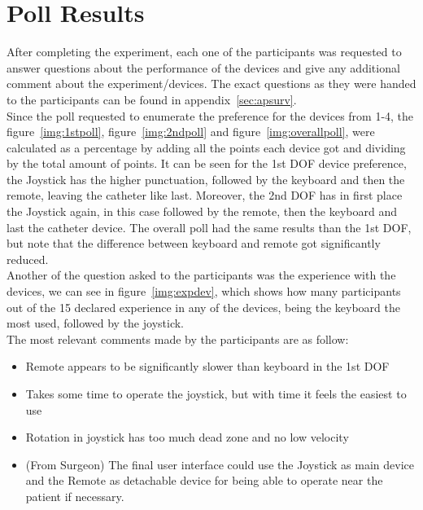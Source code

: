 \section{Poll Results}\label{sec:pollres}
After completing the experiment, each one of the participants was requested to answer questions about the performance of the devices and give any additional comment about the experiment/devices. The exact questions as they were handed to the participants can be found in appendix~\ref{sec:apsurv}.\\

Since the poll requested to enumerate the preference for the devices from 1-4, the figure~\ref{img:1stpoll}, figure~\ref{img:2ndpoll} and figure~\ref{img:overallpoll}, were calculated as a percentage by adding all the points each device got and dividing by the total amount of points. It can be seen for the 1st DOF device preference, the Joystick has the higher punctuation, followed by the keyboard and then the remote, leaving the catheter like last. Moreover, the 2nd DOF has in first place the Joystick again, in this case followed by the remote, then the keyboard and last the catheter device. The overall poll had the same results than the 1st DOF, but note that the difference between keyboard and remote got significantly reduced.\\

Another of the question asked to the participants was the experience with the devices, we can see in figure~\ref{img:expdev}, which shows how many participants out of the 15 declared experience in any of the devices, being the keyboard the most used, followed by the joystick.\\

The most relevant comments made by the participants are as follow:
\begin{itemize}
 \item  Remote appears to be significantly slower than keyboard in the 1st DOF
 \item Takes some time to operate the joystick, but with time it feels the easiest to use
 \item Rotation in joystick has too much dead zone and no low velocity
 \item 	(From Surgeon) The final user interface could use the Joystick as main device and the Remote as detachable device for being able to operate near the patient if necessary.\\
\end{itemize}

